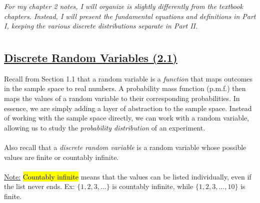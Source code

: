 ﻿\documentclass[12pt]{article}
\begin{document}
\textit{For my chapter 2 notes, I will organize is slightly differently from the textbook chapters. Instead, I will present the fundamental equations and definitions in Part I, keeping the various discrete distributions separate in Part II.}
\section*{}
\subsection*{\underline{Discrete Random Variables (2.1)}}
Recall from Section 1.1 that a random variable is a \textit{function} that maps outcomes in the sample space to real numbers. A probability mass function (p.m.f.) then maps the values of a random variable to their corresponding probabilities. In essence, we are simply adding a layer of abstraction to the sample space. Instead of working with the sample space directly, we can work with a random variable, allowing us to study the \textit{probability distribution} of an experiment.\\\\
Also recall that a \textit{discrete random variable} is a random variable whose possible values are finite or countably infinite.\\\\
\underline{Note:} \hl{Countably infinite} means that the values can be listed individually, even if the list never ends. Ex: $\{1,2,3,\dots\}$ is countably infinite, while $\{1,2,3,\dots,10\}$ is finite.
\end{document}
